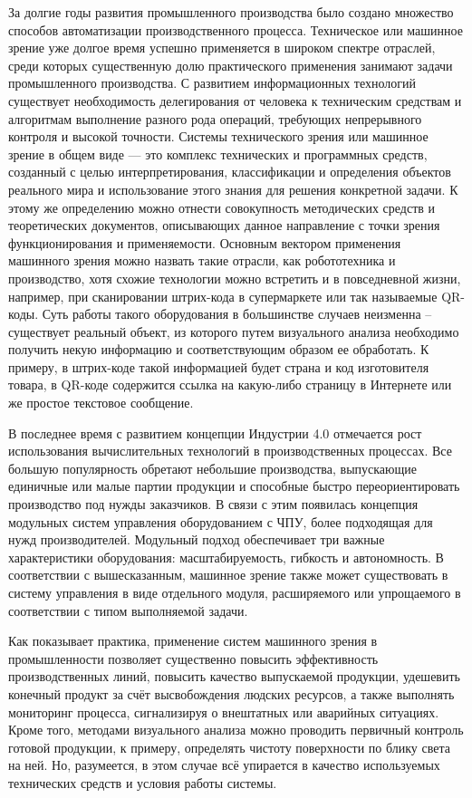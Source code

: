 
{\actuality} За долгие годы развития промышленного производства было создано множество способов автоматизации производственного процесса. Техническое или машинное зрение уже долгое время успешно применяется в широком спектре отраслей, среди которых существенную долю практического применения занимают задачи промышленного производства. С развитием информационных технологий существует необходимость делегирования от человека к техническим средствам и алгоритмам выполнение разного рода операций, требующих непрерывного контроля и высокой точности. Системы технического зрения или машинное зрение в общем виде --- это комплекс технических и программных средств, созданный с целью интерпретирования, классификации и определения объектов реального мира и использование этого знания для решения конкретной задачи. К этому же определению можно отнести совокупность методических средств и теоретических документов, описывающих данное направление с точки зрения функционирования и применяемости. Основным вектором применения машинного зрения можно назвать такие отрасли, как робототехника и производство, хотя схожие технологии можно встретить и в повседневной жизни, например, при сканировании штрих-кода в супермаркете или так называемые QR-коды. Суть работы такого оборудования в большинстве случаев неизменна – существует реальный объект, из которого путем визуального анализа необходимо получить некую информацию и соответствующим образом ее обработать. К примеру, в штрих-коде такой информацией будет страна и код изготовителя товара, в QR-коде содержится ссылка на какую-либо страницу в Интернете или же простое текстовое сообщение.

В последнее время с развитием концепции Индустрии 4.0 отмечается рост использования вычислительных технологий в производственных процессах. Все большую популярность обретают небольшие производства, выпускающие единичные или малые партии продукции и способные быстро переориентировать производство под нужды заказчиков. В связи с этим появилась концепция модульных систем управления оборудованием с ЧПУ, более подходящая для нужд производителей. Модульный подход обеспечивает три важные характеристики оборудования: масштабируемость, гибкость и автономность. В соответствии с вышесказанным, машинное зрение также может существовать в систему управления в виде отдельного модуля, расширяемого или упрощаемого в соответствии с типом выполняемой задачи.

Как показывает практика, применение систем машинного зрения в промышленности позволяет существенно повысить эффективность производственных линий, повысить качество выпускаемой продукции, удешевить конечный продукт за счёт высвобождения людских ресурсов, а также выполнять мониторинг процесса, сигнализируя о внештатных или аварийных ситуациях. Кроме того, методами визуального анализа можно проводить первичный контроль готовой продукции, к примеру, определять чистоту поверхности по блику света на ней. Но, разумеется, в этом случае всё упирается в качество используемых технических средств и условия работы системы.

